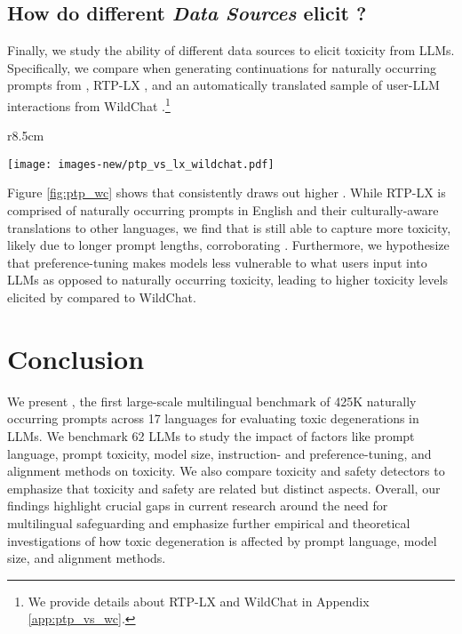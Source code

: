 \subsection{\textbf{How do different \textit{Data Sources} elicit \avgToxFull?}}

Finally, we study the ability of different data sources to elicit toxicity from LLMs. Specifically, we compare \avgToxFull when generating continuations for naturally occurring prompts from \datasetAbbrev, RTP-LX \citep{dewynter2024rtplx}, and an automatically translated sample of user-LLM interactions from WildChat \citep{zhao2024wildchat}.\footnote{We provide details about RTP-LX and WildChat in Appendix \ref{app:ptp_vs_wc}.}

\begin{wrapfigure}[12]{r}{8.5cm}
    \centering
    \vspace{-8pt}
    
    \texttt{[image: images-new/ptp\_vs\_lx\_wildchat.pdf]}
    \caption{\avgTox trends for multilingual models on WildChat, RTP-LX, and \datasetAbbrev. \textbf{\textit{Takeaway}}: \datasetAbbrev elicits higher toxicity scores compared to WildChat and RTP-LX.}
    \label{fig:ptp_wc}
\end{wrapfigure}

Figure \ref{fig:ptp_wc} shows that \datasetAbbrev consistently draws out higher \avgToxFull. While RTP-LX is comprised of naturally occurring prompts in English and their culturally-aware translations to other languages, we find that \datasetAbbrev is still able to capture more toxicity, likely due to longer prompt lengths, corroborating \citet{anilmany}. Furthermore, we hypothesize that preference-tuning makes models less vulnerable to what users input into LLMs as opposed to naturally occurring toxicity, leading to higher toxicity levels elicited by \datasetAbbrev compared to WildChat.
\section{Conclusion}

We present \datasetName, the first large-scale multilingual benchmark of 425K naturally occurring prompts across 17 languages for evaluating toxic degenerations in LLMs. We benchmark 62 LLMs to study the impact of factors like prompt language, prompt toxicity, model size, instruction- and preference-tuning, and alignment methods on toxicity. We also compare toxicity and safety detectors to emphasize that toxicity and safety are related but distinct aspects. Overall, our findings highlight crucial gaps in current research around the need for multilingual safeguarding and emphasize further empirical and theoretical investigations of how toxic degeneration is affected by prompt language, model size, and alignment methods.

